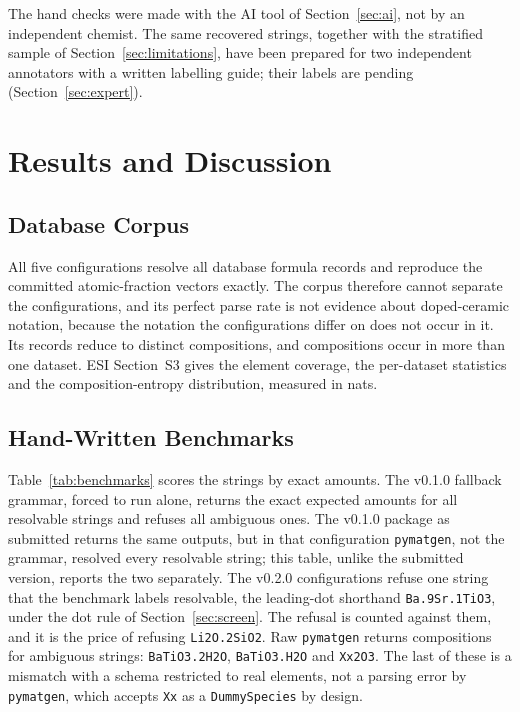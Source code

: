 \documentclass[10pt,journal]{IEEEtran}
\newcommand{\pmg}{\texttt{pymatgen}\xspace}
\begin{document}
The hand checks were made with the AI tool of Section~\ref{sec:ai}, not by an independent chemist. The same recovered strings, together with the stratified sample of Section~\ref{sec:limitations}, have been prepared for two independent annotators with a written labelling guide; their labels are pending (Section~\ref{sec:expert}).

\section{Results and Discussion}
\label{sec:results}

\subsection{Database Corpus}
All five configurations resolve all \NCorpus{} database formula records and reproduce the committed atomic-fraction vectors exactly. The corpus therefore cannot separate the configurations, and its perfect parse rate is not evidence about doped-ceramic notation, because the notation the configurations differ on does not occur in it. Its \NCorpus{} records reduce to \NCorpusReduced{} distinct compositions, and \NCorpusCrossDataset{} compositions occur in more than one dataset. ESI Section~S3 gives the element coverage, the per-dataset statistics and the composition-entropy distribution, measured in nats.

\subsection{Hand-Written Benchmarks}
Table~\ref{tab:benchmarks} scores the \NBench{} strings by exact amounts. The v0.1.0 fallback grammar, forced to run alone, returns the exact expected amounts for all \BenchResolvable{} resolvable strings and refuses all \BenchAmbiguous{} ambiguous ones. The v0.1.0 package as submitted returns the same outputs, but in that configuration \pmg, not the grammar, resolved every resolvable string; this table, unlike the submitted version, reports the two separately. The v0.2.0 configurations refuse one string that the benchmark labels resolvable, the leading-dot shorthand \texttt{Ba.9Sr.1TiO3}, under the dot rule of Section~\ref{sec:screen}. The refusal is counted against them, and it is the price of refusing \texttt{Li2O.2SiO2}. Raw \pmg returns compositions for \BenchSilentPmg{} ambiguous strings: \texttt{BaTiO3.2H2O}, \texttt{BaTiO3.H2O} and \texttt{Xx2O3}. The last of these is a mismatch with a schema restricted to real elements, not a parsing error by \pmg, which accepts \texttt{Xx} as a \texttt{DummySpecies} by design.
\end{document}
